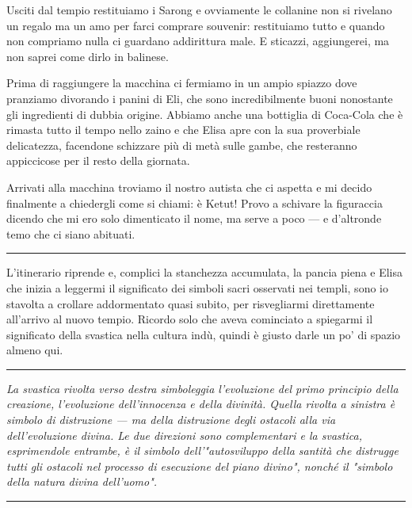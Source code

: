 Usciti dal tempio restituiamo i Sarong e ovviamente le collanine non si rivelano un regalo ma un amo per farci comprare souvenir: restituiamo tutto e quando non compriamo nulla ci guardano addirittura male. E sticazzi, aggiungerei, ma non saprei come dirlo in balinese.

Prima di raggiungere la macchina ci fermiamo in un ampio spiazzo dove pranziamo divorando i panini di Eli, che sono incredibilmente buoni nonostante gli ingredienti di dubbia origine. Abbiamo anche una bottiglia di Coca-Cola che è rimasta tutto il tempo nello zaino e che Elisa apre con la sua proverbiale delicatezza, facendone schizzare più di metà sulle gambe, che resteranno appiccicose per il resto della giornata.

Arrivati alla macchina troviamo il nostro autista che ci aspetta e mi decido finalmente a chiedergli come si chiami: è Ketut! Provo a schivare la figuraccia dicendo che mi ero solo dimenticato il nome, ma serve a poco — e d'altronde temo che ci siano abituati.

\begin{center}
    \noindent\rule{0.6\textwidth}{0.4pt}
\end{center}

L'itinerario riprende e, complici la stanchezza accumulata, la pancia piena e Elisa che inizia a leggermi il significato dei simboli sacri osservati nei templi, sono io stavolta a crollare addormentato quasi subito, per risvegliarmi direttamente all'arrivo al nuovo tempio. Ricordo solo che aveva cominciato a spiegarmi il significato della svastica nella cultura indù, quindi è giusto darle un po' di spazio almeno qui.

\begin{center}
    \noindent\rule{0.6\textwidth}{0.4pt}
\end{center}

\textit{La svastica rivolta verso destra simboleggia l'evoluzione del primo principio della creazione, l'evoluzione dell'innocenza e della divinità. Quella rivolta a sinistra è simbolo di distruzione — ma della distruzione degli ostacoli alla via dell'evoluzione divina. Le due direzioni sono complementari e la svastica, esprimendole entrambe, è il simbolo dell'"autosviluppo della santità che distrugge tutti gli ostacoli nel processo di esecuzione del piano divino", nonché il "simbolo della natura divina dell'uomo".}

\begin{center}
    \noindent\rule{0.6\textwidth}{0.4pt}
\end{center}

